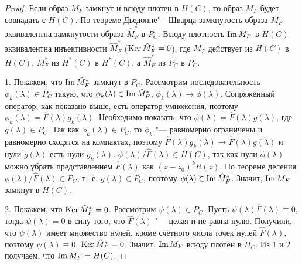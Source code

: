 \begin{proof} Если образ $M_F$ замкнут и всюду плотен в $H(C)$, то образ $M_F$ будет совпадать с $H(C)$. 
По теореме Дьедонне"--~Шварца \cite{zabirova3} замкнутость образа $M_F$ эквивалентна замкнутости образа $\hat M^*_F$ в $P_C$. 
Всюду плотность $\mathop{\rm Im}M_F$ в $H(C)$ эквивалентна инъективности $\hat M^*_F$ ($\mathop{\rm Ker} \hat M^*_F=0$), где $M_F$ действует из $H(C)$ в $H(C)$, $M^*_F$ из $H^*(C)$ в $H^*(C)$, а $\hat M^*_F$ из $P_C$ в $P_C$.

1. Покажем, что $\mathop{\rm Im} \hat M_F^*$ замкнут в $P_C$. 
Рассмотрим последовательность $\phi_k(\lambda)\in P_C$ такую, что $\phi_k(\lambda)\in \mathop{\rm Im}\hat M^*_F$, $\phi_k(\lambda)\to\phi (\lambda)$. 
Сопряжённый оператор, как показано выше, есть оператор умножения, поэтому $\phi_k(\lambda)=\hat F(\lambda)g_k(\lambda)$. 
Необходимо показать, что $\phi(\lambda)=\hat F(\lambda)g(\lambda)$, где $g(\lambda)\in P_C$. 
Так как $\phi_k(\lambda)\in P_C$, то $\phi_k$ "--- равномерно ограничены и равномерно сходятся на компактах, поэтому ${\hat F(\lambda)g_k(\lambda)}\to {\hat F(\lambda)g(\lambda)}$ и нули $g(\lambda)$ есть нули $g_k(\lambda)$. 
${\phi (\lambda)}/{\hat F(\lambda)} \in H(C)$, так как нули $\phi (\lambda)$ можно убрать представлением $\hat F(\lambda)$ как $(z-z_0)^kR(z)$. 
По теореме деления \cite{zabirova2} ${\phi (\lambda)}/{\hat F(\lambda)} \in P_C$, т.~е. $g(\lambda)\in P_C$, поэтому $\phi (\lambda) \in \mathop{\rm Im}\hat M^*_F$. Значит, $\mathop{\rm Im} M_F$ замкнут в $H(C)$.

2. Покажем, что $\mathop{\rm Ker} \hat M^*_F={0}$. 
Рассмотрим $\psi (\lambda)\in P_C$. 
Пусть $\psi(\lambda)\hat F(\lambda)\equiv 0$, тогда $\psi (\lambda)=0$ в силу того, что $\hat F(\lambda)$ "--- целая и не равна нулю. 
Получили, что $\psi(\lambda)$ имеет множество нулей, кроме счётного числа точек нулей $\hat F(\lambda)$, поэтому $\psi (\lambda)\equiv 0$, $\mathop{\rm Ker} \hat M^*_F ={0}$. Значит, $\mathop{\rm Im} M_F$ всюду плотен в $H_C$. Из 1 и 2 получаем, что $\mathop{\rm Im} M_F=H(C)$. \end{proof}


\smallskip

